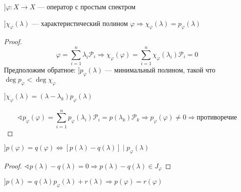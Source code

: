 \begin{example}
    $] \varphi : X\to X$ --- оператор с простым спектром

    $] \chi_\varphi(\lambda)$ --- характеристический полином $\varphi \Rightarrow \chi_\varphi(\lambda)=p_\varphi(\lambda)$
\end{example}
\begin{proof}
    $$\varphi=\sum_{i=1}^n \lambda_i\mathcal P_i \Rightarrow \chi_\varphi(\varphi)=\sum_{i=1}^n \chi_\varphi(\lambda_i)\mathcal P_i=0$$
    Предположим обратное: $] p_\varphi(\lambda)$ --- минимальный полином, такой что $\deg p_\varphi < \deg \chi_\varphi$

    $] \chi_\varphi(\lambda)=(\lambda-\lambda_k)p_\varphi(\lambda)$

    $$\sphericalangle p_\varphi(\varphi)=\sum_{i=1}^n p_\varphi(\lambda_i)\mathcal P_i = p(\lambda_k)\mathcal P_k \Rightarrow p_\varphi(\varphi)\not=0 \Rightarrow \text{противоречие}$$
\end{proof}

\begin{lemma}
    $] p(\varphi)=q(\varphi) \Leftrightarrow [p(\lambda)-q(\lambda)] \mid p_\varphi(\lambda)$
\end{lemma}
\begin{proof}
    $\sphericalangle p(\lambda)-q(\lambda)=0 \Rightarrow p(\lambda)-q(\lambda)\in J_\varphi$
\end{proof}

\begin{lemma}
    $] p(\lambda)=q(\lambda)p_\varphi(\lambda)+r(\lambda) \Rightarrow p(\varphi)=r(\varphi)$
\end{lemma}

